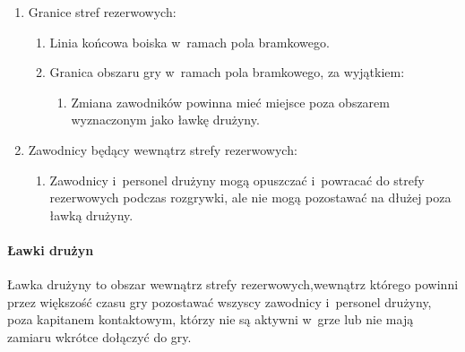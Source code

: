 \documentclass[12pt]{article}
\begin{document}
\begin{enumerate}
	\item Granice stref rezerwowych:
	      \begin{enumerate}
		      \item Linia końcowa boiska w~ramach pola bramkowego.

		      \item Granica obszaru gry w~ramach pola bramkowego, za wyjątkiem:
		            \begin{enumerate}
			            \item Zmiana zawodników powinna mieć miejsce poza obszarem wyznaczonym jako
			                  ławkę drużyny.
		            \end{enumerate}
	      \end{enumerate}

	\item Zawodnicy będący wewnątrz strefy rezerwowych:
	      \begin{enumerate}
		      \item Zawodnicy i~personel drużyny mogą opuszczać i~powracać do strefy
		            rezerwowych podczas rozgrywki, ale nie mogą pozostawać na dłużej poza
		            ławką drużyny.
	      \end{enumerate}
\end{enumerate}

\paragraph{Ławki drużyn}
Ławka drużyny to obszar wewnątrz strefy
rezerwowych,wewnątrz którego powinni przez większość czasu gry
pozostawać wszyscy zawodnicy i~personel drużyny, poza kapitanem
kontaktowym, którzy nie są aktywni w~grze lub nie mają zamiaru wkrótce
dołączyć do gry.
\end{document}

